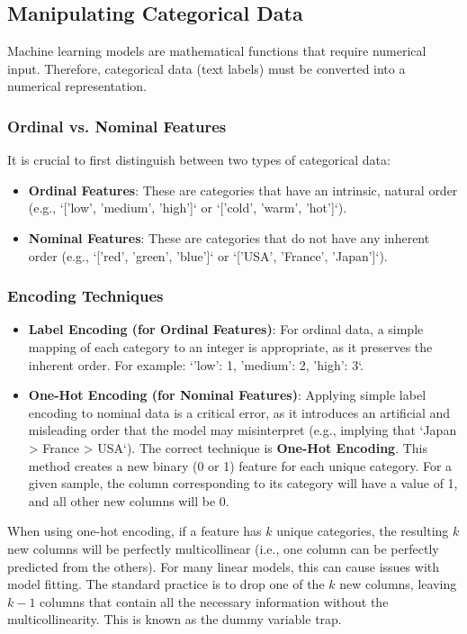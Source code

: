 \subsection{Manipulating Categorical Data}
\label{subsec:categorical_data}
Machine learning models are mathematical functions that require numerical input. Therefore, categorical data (text labels) must be converted into a numerical representation.

\subsubsection*{Ordinal vs. Nominal Features}
It is crucial to first distinguish between two types of categorical data:
\begin{itemize}
    \item \textbf{Ordinal Features}: These are categories that have an intrinsic, natural order (e.g., `['low', 'medium', 'high']` or `['cold', 'warm', 'hot']`).
    \item \textbf{Nominal Features}: These are categories that do not have any inherent order (e.g., `['red', 'green', 'blue']` or `['USA', 'France', 'Japan']`).
\end{itemize}

\subsubsection*{Encoding Techniques}
\begin{itemize}
    \item \textbf{Label Encoding (for Ordinal Features)}: For ordinal data, a simple mapping of each category to an integer is appropriate, as it preserves the inherent order. For example: `{'low': 1, 'medium': 2, 'high': 3}`.
    \item \textbf{One-Hot Encoding (for Nominal Features)}: Applying simple label encoding to nominal data is a critical error, as it introduces an artificial and misleading order that the model may misinterpret (e.g., implying that `Japan > France > USA`). The correct technique is \textbf{One-Hot Encoding}. This method creates a new binary (0 or 1) feature for each unique category. For a given sample, the column corresponding to its category will have a value of 1, and all other new columns will be 0.
\end{itemize}
\begin{remark}
When using one-hot encoding, if a feature has $k$ unique categories, the resulting $k$ new columns will be perfectly multicollinear (i.e., one column can be perfectly predicted from the others). For many linear models, this can cause issues with model fitting. The standard practice is to drop one of the $k$ new columns, leaving $k-1$ columns that contain all the necessary information without the multicollinearity. This is known as the dummy variable trap.
\end{remark}


